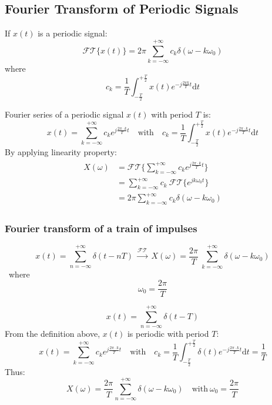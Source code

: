 \subsection{Fourier Transform of Periodic Signals}
If $x(t)$ is a periodic signal:
\[ 
\mathcal{FT} \{ x(t) \} = 2\pi \sum_{k=-\infty}^{+\infty} c_{k} \delta(\omega - k\omega_{0}) 
\]
where 
\[ 
c_{k}=\frac{1}{T} \int_{-\frac{T}{2}}^{+\frac{T}{2}} x(t) e^{-j\frac{2 \pi k}{T} t} \mathrm{d}t 
\]
\begin{dv}{}
    Fourier series of a periodic signal $x(t)$ with period $T$ is:
    \[ 
    x(t) = \sum_{k=-\infty}^{+\infty}c_{k}e^{j \frac{2\pi\cdot k}{T}t} \quad \text{with} \quad c_{k} = \frac{1}{T} \int_{-\frac{T}{2}}^{+\frac{T}{2}} x(t)e^{-j \frac{2\pi\cdot k}{T}t} \mathrm{d}t 
    \]
    By applying linearity property:
    \begin{align*}
    \begin{split}
         X(\omega) 
         &= \mathcal{FT} \bigg\{ \sum_{k=-\infty}^{+\infty}c_{k}e^{j \frac{2\pi\cdot k}{T}t} \bigg\} \\
         &=\sum_{k=-\infty}^{+\infty}c_{k} \ \mathcal{FT}\{ e^{jk\omega_{0} t}\}\\
         &= 2\pi \sum_{k=-\infty}^{+\infty} c_{k} \delta(\omega - k\omega_{0}) 
    \end{split}
    \end{align*}
\end{dv}

\subsubsection{Fourier transform of a train of impulses}
\[ 
x(t) = \sum_{n=-\infty}^{+\infty} \delta(t-nT) \ \xrightarrow{\mathcal{FT}}\ X(\omega)=\frac{2\pi}{T}  \ \sum^{+\infty}_{k=-\infty} \delta(\omega-k\omega_{0}) \]
\ where \[ \omega_{0}=\frac{2\pi}{T} 
\]

\begin{dv}{}
    \[ x(t) = \sum_{n=-\infty}^{+\infty} \delta(t-T) \]
    From the definition above, $x(t)$ is periodic with period $T$:
    \[ x(t) = \sum_{k=-\infty}^{+\infty}c_{k}e^{j \frac{2\pi\cdot k}{T}t} \quad \text{with} \quad c_{k} = \frac{1}{T} \int_{-\frac{T}{2}}^{+\frac{T}{2}} \delta(t)e^{-j \frac{2\pi\cdot k}{T}t} \mathrm{d}t = \frac{1}{T} \]
    Thus:
    \[ X(\omega) = \frac{2\pi}{T}\sum_{n=-\infty}^{+\infty}  \delta(\omega-k\omega_{0}) \quad  \text{with}\  \omega_{0}=\frac{2\pi}{T}\]
\end{dv}

